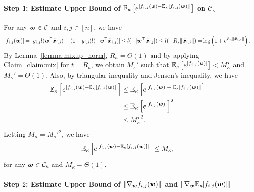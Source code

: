 \paragraph{Step 1: Estimate Upper Bound of $\mathbb{E}_\kappa \left[ e^{\left|f_{i,j}({\bm{w}}) - \mathbb{E}_\kappa[f_{i,j}({\bm{w}})]\right|}\right]$ on $\mathcal{C}_\kappa$ }\quad

For any ${\bm{w}} \in \mathcal{C}$ and $i,j \in [n]$, we have
\begin{equation*}
    |f_{i,j}({\bm{w}})| = |\tilde{y}_{i,j}l({\bm{w}}^\top \tilde{{\bm{x}}}_{i,j}) + (1-\tilde{y}_{i,j})l(-{\bm{w}}^\top \tilde{{\bm{x}}}_{i,j})| \leq l(-|{\bm{w}}^\top \tilde{{\bm{x}}}_{i,j}|) \leq l(-R_\kappa \lVert \tilde{{\bm{x}}}_{i,j} \rVert) = \log \left( 1+e^{R_\kappa \lVert \tilde{{\bm{x}}}_{i,j}\rVert} \right) .
\end{equation*}
By Lemma~\ref{lemma:mixup_norm}, $R_\kappa = \Theta(1)$ and by applying Claim~\ref{claim:mix} for $t = R_\kappa$,  we obtain $M_\kappa'$ such that $\mathbb{E}_\kappa\left[ e^{|f_{i,j}({\bm{w}})|}\right] < M_\kappa'$ and $M_\kappa' = \Theta(1)$.
Also, by triangular inequality and Jensen's inequality, we have
\begin{align*}
\mathbb{E}_\kappa \left[ e^{\left|f_{i,j}({\bm{w}}) - \mathbb{E}_\kappa[f_{i,j}({\bm{w}})]\right|}\right]
&\leq \mathbb{E}_\kappa \left[ e^{\left|f_{i,j}({\bm{w}})\right| + \left|\mathbb{E}_\kappa[f_{i,j}({\bm{w}})]\right|}\right]\\
&\leq \mathbb{E}_\kappa \left[ e^{\left|f_{i,j}({\bm{w}})\right| }\right]^2\\
&\leq {M_\kappa'}^2.
\end{align*}
Letting $M_\kappa  = {M_\kappa'^2}$, we have
\begin{equation*}
\mathbb{E}_\kappa \left[ e^{\left|f_{i,j}({\bm{w}}) - \mathbb{E}_\kappa[f_{i,j}({\bm{w}})]\right|}\right] \leq M_\kappa,
\end{equation*}
for any ${\bm{w}} \in \mathcal{C}_\kappa$ and $M_\kappa = \Theta(1)$.

\paragraph{Step 2: Estimate Upper Bound of $\lVert \nabla_{{\bm{w}}} f_{i,j}({\bm{w}}) \rVert$ and $\lVert \nabla_{\bm{w}} \mathbb{E}_\kappa[f_{i,j}({\bm{w}})]\rVert$ } \quad

